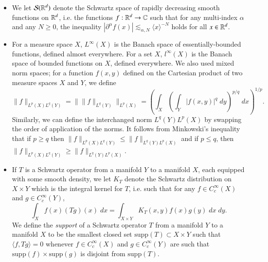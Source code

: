 \begin{itemize}
    \item We let $\mathcal{S}(\operatorname{\mathbb{R}}^d)$ denote the Schwartz space of rapidly decreasing smooth functions on $\operatorname{\mathbb{R}}^d$, i.e. the functions $f: \operatorname{\mathbb{R}}^d \to \operatorname{\mathbb{C}}$ such that for any multi-index $\alpha$ and any $N \geq 0$, the inequality $|\partial^\alpha f(x)| \lesssim_{\alpha,N} \langle x \rangle^{-N}$ holds for all $x \in \operatorname{\mathbb{R}}^d$.

    \item For a measure space $X$, $L^\infty(X)$ is the Banach space of essentially-bounded functions, defined almost everywhere. For a set $X$, $l^\infty(X)$ is the Banach space of bounded functions on $X$, defined everywhere. We also used mixed norm spaces; for a function $f(x,y)$ defined on the Cartesian product of two measure spaces $X$ and $Y$, we define
    \[ \| f \|_{L^p(X) L^q(Y)} = \big\| \| f \|_{L^q(Y)} \big\|_{L^p(X)} = \left( \int\nolimits_X \left( \int\nolimits_Y |f(x,y)|^q\; dy \right)^{p/q}\; dx \right)^{1/p}. \]
    Similarly, we can define the interchanged norm $L^q(Y) L^p(X)$ by swapping the order of application of the norms. It follows from Minkowski's inequality that if $p \geq q$ then $\| f \|_{L^p(X) L^q(Y)} \leq \| f \|_{L^q(Y) L^p(X)}$ and if $p \leq q$, then $\| f \|_{L^p(X) L^q(Y)} \geq \| f \|_{L^q(Y) L^p(X)}$.

    \item If $T$ is a Schwartz operator from a manifold $Y$ to a manifold $X$, each equipped with some smooth density, we let $K_T$ denote the Schwartz distribution on $X \times Y$ which is the integral kernel for $T$, i.e. such that for any $f \in C_c^\infty(X)$ and $g \in C_c^\infty(Y)$,
    \[ \int_X f(x) (Tg)(x)\; dx = \int_{X \times Y} K_T(x,y) f(x) g(y)\; dx\; dy. \]
    We define the \emph{support} of a Schwartz operator $T$ from a manifold $Y$ to a manifold $X$ to be the smallest closed set $\text{supp}(T) \subset X \times Y$ such that $\langle f, Tg \rangle = 0$ whenever $f \in C_c^\infty(X)$ and $g \in C_c^\infty(Y)$ are such that $\text{supp}(f) \times \text{supp}(g)$ is disjoint from $\text{supp}(T)$.



\end{itemize}
